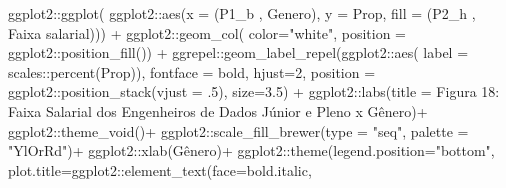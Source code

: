 \documentclass[
]{article}
\newenvironment{Shaded}{\begin{snugshade}}{\end{snugshade}}
\newcommand{\AttributeTok}[1]{\textcolor[rgb]{0.77,0.63,0.00}{#1}}
\newcommand{\DecValTok}[1]{\textcolor[rgb]{0.00,0.00,0.81}{#1}}
\newcommand{\FloatTok}[1]{\textcolor[rgb]{0.00,0.00,0.81}{#1}}
\newcommand{\FunctionTok}[1]{\textcolor[rgb]{0.00,0.00,0.00}{#1}}
\newcommand{\NormalTok}[1]{#1}
\newcommand{\SpecialCharTok}[1]{\textcolor[rgb]{0.00,0.00,0.00}{#1}}
\newcommand{\StringTok}[1]{\textcolor[rgb]{0.31,0.60,0.02}{#1}}
\begin{document}
\begin{Shaded}
\begin{Highlighting}[]
\NormalTok{  ggplot2}\SpecialCharTok{::}\FunctionTok{ggplot}\NormalTok{(}
\NormalTok{    ggplot2}\SpecialCharTok{::}\FunctionTok{aes}\NormalTok{(}\AttributeTok{x =} \StringTok{\textasciigrave{}}\AttributeTok{(\textquotesingle{}P1\_b \textquotesingle{}, \textquotesingle{}Genero\textquotesingle{})}\StringTok{\textasciigrave{}}\NormalTok{, }\AttributeTok{y =}\NormalTok{ Prop,}
                 \AttributeTok{fill =} \StringTok{\textasciigrave{}}\AttributeTok{(\textquotesingle{}P2\_h \textquotesingle{}, \textquotesingle{}Faixa salarial\textquotesingle{})}\StringTok{\textasciigrave{}}\NormalTok{)) }\SpecialCharTok{+}
\NormalTok{  ggplot2}\SpecialCharTok{::}\FunctionTok{geom\_col}\NormalTok{( }\AttributeTok{color=}\StringTok{"white"}\NormalTok{,}
                     \AttributeTok{position =}\NormalTok{ ggplot2}\SpecialCharTok{::}\FunctionTok{position\_fill}\NormalTok{()) }\SpecialCharTok{+}
\NormalTok{  ggrepel}\SpecialCharTok{::}\FunctionTok{geom\_label\_repel}\NormalTok{(ggplot2}\SpecialCharTok{::}\FunctionTok{aes}\NormalTok{(}
    \AttributeTok{label =}\NormalTok{ scales}\SpecialCharTok{::}\FunctionTok{percent}\NormalTok{(Prop)),}
    \AttributeTok{fontface =} \StringTok{\textquotesingle{}bold\textquotesingle{}}\NormalTok{,}
    \AttributeTok{hjust=}\DecValTok{2}\NormalTok{,}
    \AttributeTok{position =}\NormalTok{ ggplot2}\SpecialCharTok{::}\FunctionTok{position\_stack}\NormalTok{(}\AttributeTok{vjust =}\NormalTok{ .}\DecValTok{5}\NormalTok{),}
    \AttributeTok{size=}\FloatTok{3.5}\NormalTok{) }\SpecialCharTok{+}
\NormalTok{  ggplot2}\SpecialCharTok{::}\FunctionTok{labs}\NormalTok{(}\AttributeTok{title =} \StringTok{\textquotesingle{}Figura 18: Faixa Salarial dos Engenheiros de Dados Júnior e Pleno x Gênero\textquotesingle{}}\NormalTok{)}\SpecialCharTok{+}
\NormalTok{  ggplot2}\SpecialCharTok{::}\FunctionTok{theme\_void}\NormalTok{()}\SpecialCharTok{+}
\NormalTok{  ggplot2}\SpecialCharTok{::}\FunctionTok{scale\_fill\_brewer}\NormalTok{(}\AttributeTok{type =} \StringTok{"seq"}\NormalTok{, }\AttributeTok{palette =} \StringTok{"YlOrRd"}\NormalTok{)}\SpecialCharTok{+}
\NormalTok{  ggplot2}\SpecialCharTok{::}\FunctionTok{xlab}\NormalTok{(}\StringTok{\textquotesingle{}Gênero\textquotesingle{}}\NormalTok{)}\SpecialCharTok{+}
\NormalTok{  ggplot2}\SpecialCharTok{::}\FunctionTok{theme}\NormalTok{(}\AttributeTok{legend.position=}\StringTok{"bottom"}\NormalTok{,}
                 \AttributeTok{plot.title=}\NormalTok{ggplot2}\SpecialCharTok{::}\FunctionTok{element\_text}\NormalTok{(}\AttributeTok{face=}\StringTok{\textquotesingle{}bold.italic\textquotesingle{}}\NormalTok{,}

\end{Highlighting}
\end{Shaded}
\end{document}
